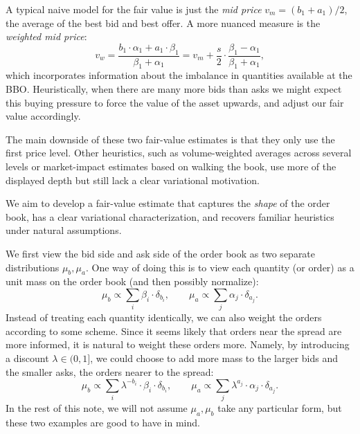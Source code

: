 \documentclass[11pt]{article}
\theoremstyle{plain}
\theoremstyle{definition}
\numberwithin{equation}{section}
\begin{document}
A typical naive model for the fair value is just the \textit{mid price}
$v_{m} = (b_1 + a_1) / 2$, the average of the best bid and best offer.
 A more nuanced measure is the \textit{weighted mid price}:
%
\[v_w = \frac{b_1 \cdot \alpha_1 + a_1 \cdot \beta_1}{\beta_1 + \alpha_1} = v_m + \frac{s}{2} \cdot \frac{\beta_1 - \alpha_1}{\beta_1 + \alpha_1},\]
%
which incorporates information about the imbalance in quantities available at the
 BBO. Heuristically, when there are many more bids than asks we might expect this
 buying pressure to force the value of the asset upwards, and adjust our
 fair value accordingly.

The main downside of these two fair-value estimates is that they only use the
first price level. Other heuristics, such as volume-weighted averages across
several levels or market-impact estimates based on walking the book, use more of
the displayed depth but still lack a clear variational motivation.

We aim to develop a fair-value estimate that captures the \textit{shape} of the
order book, has a clear variational characterization, and recovers familiar
heuristics under natural assumptions.

We first view the bid side and ask side of the order book as two separate
distributions $\mu_b, \mu_a$. One way of doing
this is to view each quantity (or order) as a unit mass on the order book
(and then possibly normalize):
%
\begin{equation}
    \mu_b \propto \sum_{i} \beta_i \cdot \delta_{b_i}, \qquad \mu_a \propto \sum_{j} \alpha_j \cdot \delta_{a_j}.
    \label{eqn:mua_mub_proportional}
\end{equation}
%
\noindent Instead of treating each quantity identically, we can also weight
 the orders according to some scheme. Since it seems likely that orders near the spread
 are more informed, it is natural to weight these orders more. Namely, by introducing a
 discount $\lambda \in (0,1]$, we could choose to add more mass to the larger bids and
 the smaller asks, the orders nearer to the spread:
%
\begin{equation}
    \mu_b \propto \sum_{i} \lambda^{-b_i} \cdot \beta_i \cdot \delta_{b_i}, \qquad \mu_a \propto \sum_{j} \lambda^{a_j} \cdot \alpha_j \cdot \delta_{a_j}.
    \label{eqn:mua_mub}
\end{equation}
%
In the rest of this note, we will not assume $\mu_a, \mu_b$ take any
 particular form, but these two examples are good to have in mind.
\end{document}
